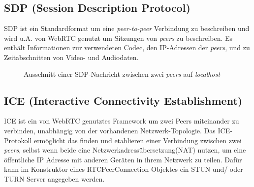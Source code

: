 \subsection{SDP (Session Description Protocol)}
\label{subsec:sdp}
SDP ist ein Standardformat um eine \textit{peer-to-peer} Verbindung zu beschreiben und wird u.A. von WebRTC genutzt um Sitzungen von \textit{peers} zu beschreiben.
Es enthält Informationen zur verwendeten Codec, den IP-Adressen der \textit{peers}, und zu Zeitabschnitten von Video- und Audiodaten\parencite{MDNSdp}.
\begin{figure}[!ht]
    \caption{Ausschnitt einer SDP-Nachricht zwischen zwei \textit{peers} auf \textit{localhost}}
    \label{fig:sdp-localhost}
\end{figure}

\subsection{ICE (Interactive Connectivity Establishment)}
\label{subsec:ice}
ICE ist ein von WebRTC genutztes Framework um zwei Peers miteinander zu verbinden, unabhängig von der vorhandenen Netzwerk-Topologie. \parencite{RFCIce}
Das ICE-Protokoll ermöglicht das finden und etablieren einer Verbindung zwischen zwei \textit{peers}, selbst wenn beide eine Netzwerkadressübersetzung(NAT)
nutzen, um eine öffentliche IP Adresse mit anderen Geräten in ihrem Netzwerk zu teilen.
Dafür kann im Konstruktor eines RTCPeerConnection-Objektes ein STUN und/-oder TURN Server angegeben werden.

